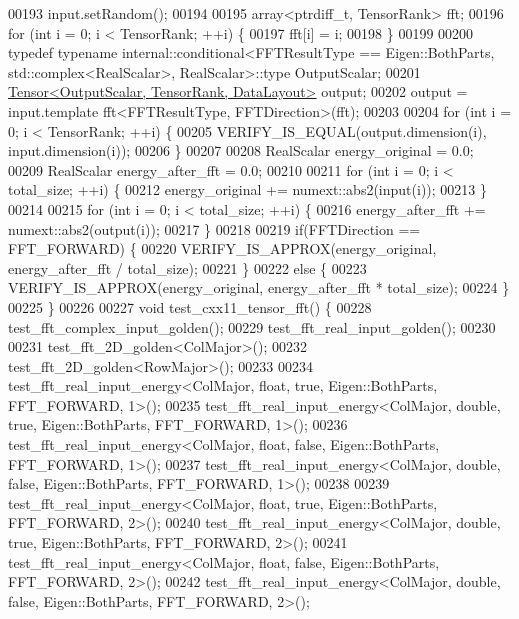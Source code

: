 \begin{DoxyCode}
00193   input.setRandom();
00194 
00195   array<ptrdiff\_t, TensorRank> fft;
00196   \textcolor{keywordflow}{for} (\textcolor{keywordtype}{int} i = 0; i < TensorRank; ++i) \{
00197     fft[i] = i;
00198   \}
00199 
00200   \textcolor{keyword}{typedef} \textcolor{keyword}{typename} internal::conditional<FFTResultType == Eigen::BothParts, std::complex<RealScalar>, 
      RealScalar>::type OutputScalar;
00201   \hyperlink{class_eigen_1_1_tensor}{Tensor<OutputScalar, TensorRank, DataLayout>} output;
00202   output = input.template fft<FFTResultType, FFTDirection>(fft);
00203 
00204   \textcolor{keywordflow}{for} (\textcolor{keywordtype}{int} i = 0; i < TensorRank; ++i) \{
00205     VERIFY\_IS\_EQUAL(output.dimension(i), input.dimension(i));
00206   \}
00207 
00208   RealScalar energy\_original = 0.0;
00209   RealScalar energy\_after\_fft = 0.0;
00210 
00211   \textcolor{keywordflow}{for} (\textcolor{keywordtype}{int} i = 0; i < total\_size; ++i) \{
00212     energy\_original += numext::abs2(input(i));
00213   \}
00214 
00215   \textcolor{keywordflow}{for} (\textcolor{keywordtype}{int} i = 0; i < total\_size; ++i) \{
00216     energy\_after\_fft += numext::abs2(output(i));
00217   \}
00218 
00219   \textcolor{keywordflow}{if}(FFTDirection == FFT\_FORWARD) \{
00220     VERIFY\_IS\_APPROX(energy\_original, energy\_after\_fft / total\_size);
00221   \}
00222   \textcolor{keywordflow}{else} \{
00223     VERIFY\_IS\_APPROX(energy\_original, energy\_after\_fft * total\_size);
00224   \}
00225 \}
00226 
00227 \textcolor{keywordtype}{void} test\_cxx11\_tensor\_fft() \{
00228     test\_fft\_complex\_input\_golden();
00229     test\_fft\_real\_input\_golden();
00230 
00231     test\_fft\_2D\_golden<ColMajor>();
00232     test\_fft\_2D\_golden<RowMajor>();
00233 
00234     test\_fft\_real\_input\_energy<ColMajor, float,  true,  Eigen::BothParts, FFT\_FORWARD, 1>();
00235     test\_fft\_real\_input\_energy<ColMajor, double, true,  Eigen::BothParts, FFT\_FORWARD, 1>();
00236     test\_fft\_real\_input\_energy<ColMajor, float,  false,  Eigen::BothParts, FFT\_FORWARD, 1>();
00237     test\_fft\_real\_input\_energy<ColMajor, double, false,  Eigen::BothParts, FFT\_FORWARD, 1>();
00238 
00239     test\_fft\_real\_input\_energy<ColMajor, float,  true,  Eigen::BothParts, FFT\_FORWARD, 2>();
00240     test\_fft\_real\_input\_energy<ColMajor, double, true,  Eigen::BothParts, FFT\_FORWARD, 2>();
00241     test\_fft\_real\_input\_energy<ColMajor, float,  false,  Eigen::BothParts, FFT\_FORWARD, 2>();
00242     test\_fft\_real\_input\_energy<ColMajor, double, false,  Eigen::BothParts, FFT\_FORWARD, 2>();

\end{DoxyCode}
